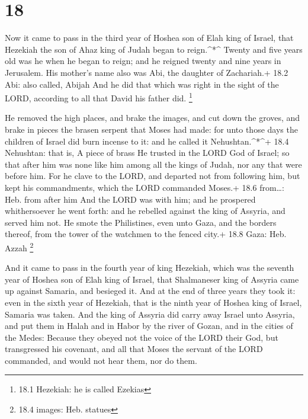 \hypertarget{section-17}{%
\section{18}\label{section-17}}

 Now it came to pass in the third year of Hoshea son of Elah
king of Israel, that Hezekiah the son of Ahaz king of Judah began to
reign.\^{}*\^{}  Twenty and five years old was he when he
began to reign; and he reigned twenty and nine years in Jerusalem. His
mother's name also was Abi, the daughter of Zachariah.+ 18.2 Abi: also
called, Abijah  And he did that which was right in the sight
of the LORD, according to all that David his father did. \footnote{18.1
  Hezekiah: he is called Ezekias}

 He removed the high places, and brake the images, and cut
down the groves, and brake in pieces the brasen serpent that Moses had
made: for unto those days the children of Israel did burn incense to it:
and he called it Nehushtan.\^{}*\^{}+ 18.4 Nehushtan: that is, A piece
of brass  He trusted in the LORD God of Israel; so that
after him was none like him among all the kings of Judah, nor any that
were before him.  For he clave to the LORD, and departed not
from following him, but kept his commandments, which the LORD commanded
Moses.+ 18.6 from\ldots: Heb. from after him  And the LORD
was with him; and he prospered whithersoever he went forth: and he
rebelled against the king of Assyria, and served him not. 
He smote the Philistines, even unto Gaza, and the borders thereof, from
the tower of the watchmen to the fenced city.+ 18.8 Gaza: Heb. Azzah
\footnote{18.4 images: Heb. statues}

 And it came to pass in the fourth year of king Hezekiah,
which was the seventh year of Hoshea son of Elah king of Israel, that
Shalmaneser king of Assyria came up against Samaria, and besieged it.
 And at the end of three years they took it: even in the
sixth year of Hezekiah, that is the ninth year of Hoshea king of Israel,
Samaria was taken.  And the king of Assyria did carry away
Israel unto Assyria, and put them in Halah and in Habor by the river of
Gozan, and in the cities of the Medes:  Because they obeyed
not the voice of the LORD their God, but transgressed his covenant, and
all that Moses the servant of the LORD commanded, and would not hear
them, nor do them.

